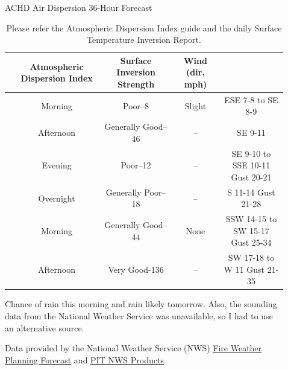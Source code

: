 \documentclass[final,xcolor=table]{beamer}
\newlength{\sepwidth}
\newlength{\colwidth}
\newcommand{\separatorcolumn}{\begin{column}{\sepwidth}\end{column}}
\begin{document}
\begin{frame}[t]
\begin{columns}[t]
\begin{column}{\colwidth}
\begin{block}{ACHD Air Dispersion 36-Hour Forecast}
    \begin{table}
      \begin{adjustbox}{width=1\textwidth}
      \renewcommand{\arraystretch}{1.5}
      \centering
      \begin{tabular}{ |c|c|c|c|c|}
      \hline
      \rowcolor{lightgray}\multicolumn{2}{|c|}{\textbf{Forecast Period}} & \textbf{Atmospheric Dispersion Index} & \textbf{Surface Inversion Strength} & \textbf{Wind (dir, mph)}\\
      \hline
      \rowcolor[HTML]{F2FDFE}\multirow{\textbf{Today}} & Morning & Poor–8 & Slight & ESE 7-8 to SE 8-9 \\ 
      \rowcolor[HTML]{F2FDFE} & Afternoon & Generally Good–46 & -- & SE 9-11 \\
      \hline
      \rowcolor[HTML]{F2FDFE}\multirow{\textbf{Tonight}} & Evening  & Poor–12 & -- & SE 9-10 to SSE 10-11 Gust 20-21\\
      \rowcolor[HTML]{F2FDFE} & Overnight & Generally Poor–18 & -- & S 11-14 Gust 21-28\\
      \hline
      \rowcolor[HTML]{F2FDFE}\multirow{\textbf{Tomorrow}} & Morning & Generally Good–44 & None & SSW 14-15 to SW 15-17 Gust 25-34\\
      \rowcolor[HTML]{F2FDFE} & Afternoon & Very Good-136 & -- & SW 17-18 to W 11 Gust 21-35\\
      \hline
      \end{tabular}
      \end{adjustbox}
      \caption{Please refer the Atmospheric Dispersion Index guide and the daily Surface Temperature Inversion Report.}
    \end{table}

    Chance of rain this morning and rain likely tomorrow. Also, the sounding data from the National Weather Service was unavailable, so I had to use an alternative source.
    
    Data provided by the National Weather Service (NWS)
    \href{https://forecast.weather.gov/product.php?site=NWS&product=FWF&issuedby=PBZ}{\underline{Fire Weather Planning Forecast}} and \href{http://weather.uwyo.edu/upperair/sounding.html}{\underline{PIT NWS Products}}

  \end{block}
  
\end{column}

\separatorcolumn

\begin{column}{\colwidth}


\end{column}
\end{columns}
\end{frame}
\end{document}

